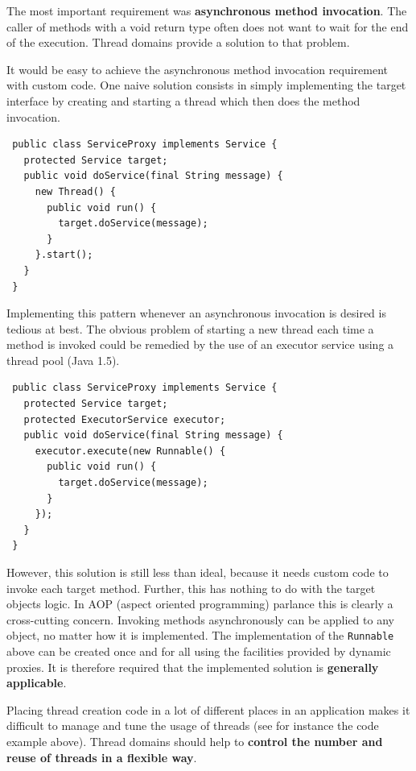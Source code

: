 The most important requirement was \textbf{asynchronous method invocation}. 
The caller of methods with a void return type often does not want to wait
for the end of the execution. Thread domains provide a solution to that
problem.

It would be easy to achieve the asynchronous method invocation requirement
with custom code. One naive solution consists in simply implementing the target
interface by creating and starting a thread which then does the method
invocation.

\small{\begin{verbatim}
 public class ServiceProxy implements Service {
   protected Service target;
   public void doService(final String message) {
     new Thread() {
       public void run() {
         target.doService(message);
       }
     }.start();
   }
 }
\end{verbatim}}

Implementing this pattern whenever an asynchronous invocation is desired
is tedious at best. The obvious problem of starting a new thread
each time a method is invoked could be remedied by the use of an
executor service using a thread pool (Java 1.5).

\small{\begin{verbatim}
 public class ServiceProxy implements Service {
   protected Service target;
   protected ExecutorService executor;
   public void doService(final String message) {
     executor.execute(new Runnable() {
       public void run() {
         target.doService(message);
       }
     });
   }
 }
\end{verbatim}}

However, this solution is still less than ideal, because it needs custom code
to invoke each target method. Further, this has nothing to do with the
target objects logic. In AOP (aspect oriented programming) parlance this
is clearly a cross-cutting concern. Invoking methods asynchronously can 
be applied to any object, no matter how it is implemented. The implementation
of the \texttt{Runnable} above can be created once and for all using the
facilities provided by dynamic proxies. It is therefore
required that the implemented solution is \textbf{generally applicable}.

Placing thread creation code in a lot of different places in an application
makes it difficult to manage and tune the usage of threads (see for instance
the code example above). Thread domains should help to \textbf{control the
number and reuse of threads in a flexible way}.

